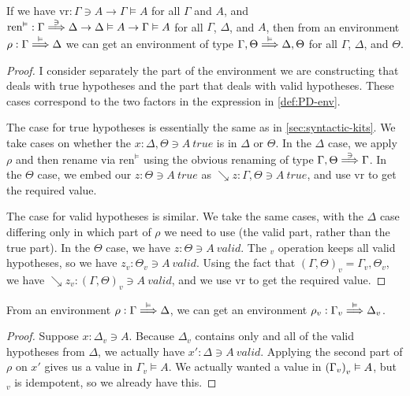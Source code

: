 \begin{lemma}[bindEnv]\label{thm:PD-bindEnv}
  If we have $\mathrm{vr} : \Gamma \ni A \to \Gamma \vDash A$ for all
  $\Gamma$ and $A$, and
  $\mathrm{ren}^\vDash :
  \Gamma \stackrel{\ni}\Longrightarrow \Delta \to \Delta \vDash A \to \Gamma \vDash A$
  for all $\Gamma$, $\Delta$, and $A$,
  then from an environment $\rho : \Gamma \stackrel{\vDash}\Longrightarrow \Delta$
  we can get an environment of type $\Gamma, \Theta \stackrel{\vDash}\Longrightarrow \Delta, \Theta$
  for all $\Gamma$, $\Delta$, and $\Theta$.
\end{lemma}
\begin{proof}
  I consider separately the part of the environment we are constructing that
  deals with true hypotheses and the part that deals with valid hypotheses.
  These cases correspond to the two factors in the expression in
  \cref{def:PD-env}.

  The case for true hypotheses is essentially the same as in
  \cref{sec:syntactic-kits}.
  We take cases on whether the $x : \Delta, \Theta \ni A~\mathit{true}$ is in
  $\Delta$ or $\Theta$.
  In the $\Delta$ case, we apply $\rho$ and then rename via
  $\mathrm{ren}^\vDash$ using the obvious renaming of type
  $\Gamma, \Theta \stackrel{\ni}\Longrightarrow \Gamma$.
  In the $\Theta$ case, we embed our $z : \Theta \ni A~\mathit{true}$ as
  $\searrow z : \Gamma, \Theta \ni A~\mathit{true}$, and use $\mathrm{vr}$ to
  get the required value.

  The case for valid hypotheses is similar.
  We take the same cases, with the $\Delta$ case differing only in which part of
  $\rho$ we need to use (the valid part, rather than the true part).
  In the $\Theta$ case, we have $z : \Theta \ni A~\mathit{valid}$.
  The $_v$ operation keeps all valid hypotheses, so we have
  $z_v : \Theta_v \ni A~\mathit{valid}$.
  Using the fact that $(\Gamma, \Theta)_v = \Gamma_v, \Theta_v$, we have
  $\searrow z_v : (\Gamma, \Theta)_v \ni A~\mathit{valid}$, and we use
  $\mathrm{vr}$ to get the required value.
\end{proof}

\begin{lemma}\label{thm:PD-vEnv}
  From an environment $\rho : \Gamma \stackrel{\vDash}\Longrightarrow \Delta$, we can get an
  environment $\rho_v : \Gamma_v \stackrel{\vDash}\Longrightarrow \Delta_v$.
\end{lemma}
\begin{proof}
  Suppose $x : \Delta_v \ni A$.
  Because $\Delta_v$ contains only and all of the valid hypotheses from
  $\Delta$, we actually have $x' : \Delta \ni A~\mathit{valid}$.
  Applying the second part of $\rho$ on $x'$ gives us a value in
  $\Gamma_v \vDash A$.
  We actually wanted a value in $\plr{\Gamma_v}_v \vDash A$, but $_v$ is
  idempotent, so we already have this.
\end{proof}

